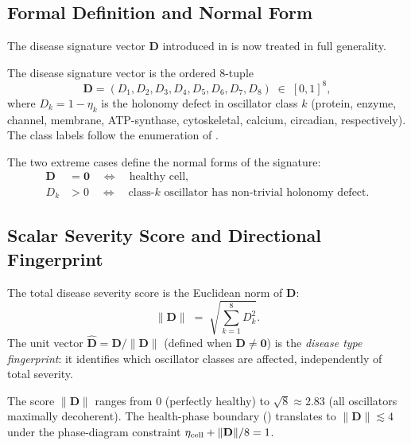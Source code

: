 \subsection{Formal Definition and Normal Form}

The disease signature vector $\mathbf{D}$ introduced in
 is now treated in full generality.

\begin{definition}
\label{def:ch04-disease-signature}
The disease signature vector is the ordered 8-tuple
\begin{equation}
\label{eq:ch04-Dvec}
    \mathbf{D} = (D_1, D_2, D_3, D_4, D_5, D_6, D_7, D_8)
        \;\in\; [0,1]^8,
\end{equation}
where $D_k = 1 - \eta_k$ is the holonomy defect in oscillator class $k$
(protein, enzyme, channel, membrane, ATP-synthase, cytoskeletal, calcium,
circadian, respectively).  The class labels follow the enumeration of
.
\end{definition}

The two extreme cases define the normal forms of the signature:
\begin{align}
    \mathbf{D} &= \mathbf{0} \quad\Leftrightarrow\quad \text{healthy cell}, \\
    D_k &> 0   \quad\Leftrightarrow\quad \text{class-}k \text{ oscillator
                              has non-trivial holonomy defect}.
\end{align}

\subsection{Scalar Severity Score and Directional Fingerprint}

\begin{definition}
\label{def:ch04-severity-score}
The total disease severity score is the Euclidean norm of $\mathbf{D}$:
\begin{equation}
    \|\mathbf{D}\| \;=\; \sqrt{\sum_{k=1}^{8} D_k^2}.
\end{equation}
The unit vector $\hat{\mathbf{D}} = \mathbf{D}/\|\mathbf{D}\|$ (defined when
$\mathbf{D} \neq \mathbf{0}$) is the \emph{disease type fingerprint}: it
identifies which oscillator classes are affected, independently of total
severity.
\end{definition}

The score $\|\mathbf{D}\|$ ranges from 0 (perfectly healthy) to
$\sqrt{8} \approx 2.83$ (all oscillators maximally decoherent).  The
health-phase boundary () translates to
$\|\mathbf{D}\| \lesssim 4$ under the phase-diagram constraint
$\eta_{\mathrm{cell}} + \|\mathbf{D}\|/8 = 1$.

